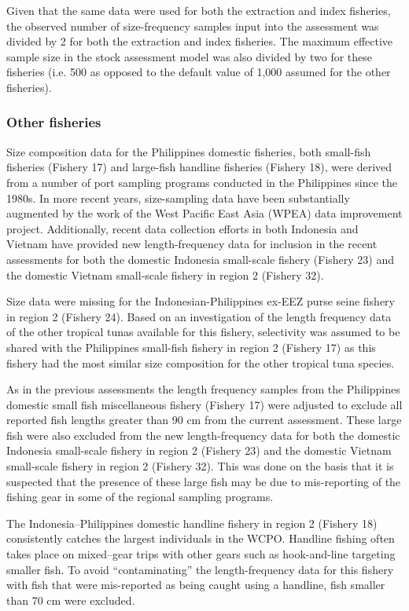 Given that the same data were used for both the extraction and index fisheries, the observed number of size-frequency samples input into the assessment was divided by 2 for both the extraction and index fisheries. The maximum effective sample size in the stock assessment model was also divided by two for these fisheries (i.e. 500 as opposed to the default value of 1,000 assumed for the other fisheries).

\subsubsection{Other fisheries}
\label{sec:size_others}

Size composition data for the Philippines domestic fisheries, both small-fish fisheries (Fishery 17) and large-fish handline fisheries (Fishery 18), were derived from a number of port sampling programs conducted in the Philippines since the 1980s. In more recent years, size-sampling data have been substantially augmented by the work of the West Pacific East Asia (WPEA) data improvement project. Additionally, recent data collection efforts in both Indonesia and Vietnam have provided new length-frequency data for inclusion in the recent assessments for both the domestic Indonesia small-scale fishery (Fishery 23) and the domestic Vietnam small-scale fishery in region 2 (Fishery 32).

Size data were missing for the Indonesian-Philippines ex-EEZ purse seine fishery in region 2 (Fishery 24). Based on an investigation of the length frequency data of the other tropical tunas available for this fishery, selectivity was assumed to be shared with the Philippines small-fish fishery in region 2 (Fishery 17) as this fishery had the most similar size composition for the other tropical tuna species.

As in the previous assessments the length frequency samples from the Philippines domestic small fish miscellaneous fishery (Fishery 17) were adjusted to exclude all reported fish lengths greater than 90 cm from the current assessment. These large fish were also excluded from the new length-frequency data for both the domestic Indonesia small-scale fishery in region 2 (Fishery 23) and the domestic Vietnam small-scale fishery in region 2 (Fishery 32). This was done on the basis that it is suspected that the presence of these large fish may be due to mis-reporting of the fishing gear in some of the regional sampling programs.

The Indonesia--Philippines domestic handline fishery in region 2 (Fishery 18) consistently catches the largest individuals in the WCPO. Handline fishing often takes place on mixed--gear trips with other gears such as hook-and-line targeting smaller fish. To avoid \enquote{contaminating} the length-frequency data for this fishery with fish that were mis-reported as being caught using a handline, fish smaller than 70 cm were excluded.

